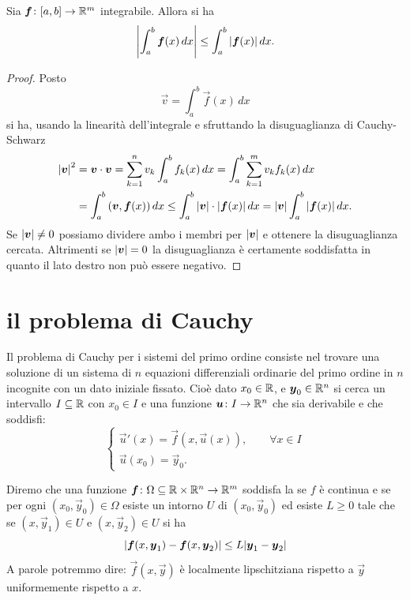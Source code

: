 \begin{theorem}\label{teo:tipo_jensen}
\mymark{*}
Sia $\boldsymbol f\colon [a,b]\to \mathbb R^m$ integrabile. Allora si ha
\[
  {\left|\int_a^b \boldsymbol f(x)\, dx\right|} \le \int_a^b {\left|\boldsymbol f(x)\right|}\, dx.
\]
\end{theorem}
%
\begin{proof}
Posto
\[
 \vec v = \int_a^b \vec f(x)\, dx
\]
si ha, usando la linearità dell'integrale
e sfruttando la disuguaglianza di Cauchy-Schwarz
\begin{align*}
  {\left|\boldsymbol v\right|}^2
  &= \boldsymbol v \cdot \boldsymbol v
   = \sum_{k=1}^n v_k \int_a^b f_k(x)\, dx
   = \int_a^b \sum_{k=1}^m v_k f_k(x)\, dx \\
  &= \int_a^b {\left( \boldsymbol v, \boldsymbol f(x) \right)}\, dx
  \le \int_a^b {\left|\boldsymbol v\right|}\cdot {\left|\boldsymbol f(x)\right|}\, dx
  = {\left|\boldsymbol v\right|} \int_a^b {\left|\boldsymbol f(x)\right|}\, dx.
\end{align*}
Se ${\left|\boldsymbol v\right|}\neq 0$ possiamo dividere ambo i membri per ${\left|\boldsymbol v\right|}$ e
ottenere la disuguaglianza cercata.
Altrimenti se ${\left|\boldsymbol v\right|}=0$ la disuguaglianza è certamente soddisfatta in
quanto il lato destro non può essere negativo.
\end{proof}


\section{il problema di Cauchy}

Il problema di Cauchy
per i sistemi del primo ordine
consiste nel
trovare una soluzione di un sistema di $n$ equazioni differenziali ordinarie del primo ordine in $n$ incognite
con un dato iniziale fissato. Cioè dato $x_0\in \mathbb R$,
e $\boldsymbol y_0 \in \mathbb R^n$ si cerca un intervallo $I\subseteq \mathbb R$ con $x_0\in I$ e una funzione $\boldsymbol u \colon I\to \mathbb R^n$
che sia derivabile e che soddisfi:
\begin{equation}\label{eq:problema_cauchy}
\begin{cases}
 \vec u'(x) = \vec f(x, \vec u(x)), \qquad \forall x\in I\\
 \vec u(x_0) = \vec y_0.
\end{cases}
\end{equation}

\begin{definition}
\label{def:cauchy_lipschitz}
Diremo che una funzione $\boldsymbol f\colon \Omega\subseteq \mathbb R\times \mathbb R^n \to \mathbb R^m$
soddisfa la  se $f$ è continua e se
per ogni $(x_0,\vec y_0)\in \Omega$ esiste un intorno $U$ di $(x_0,\vec y_0)$
ed esiste $L\ge 0$
tale che se $(x,\vec y_1)\in U$ e $(x,\vec y_2)\in U$ si ha
\[
  {\left|\boldsymbol f(x,\boldsymbol y_1)- \boldsymbol f(x,\boldsymbol y_2)\right|} \le L {\left|\boldsymbol y_1- \boldsymbol y_2\right|}
\]
A parole potremmo dire: $\vec f(x,\vec y)$ è localmente lipschitziana rispetto
a $\vec y$ uniformemente
rispetto a $x$.
\end{definition}

